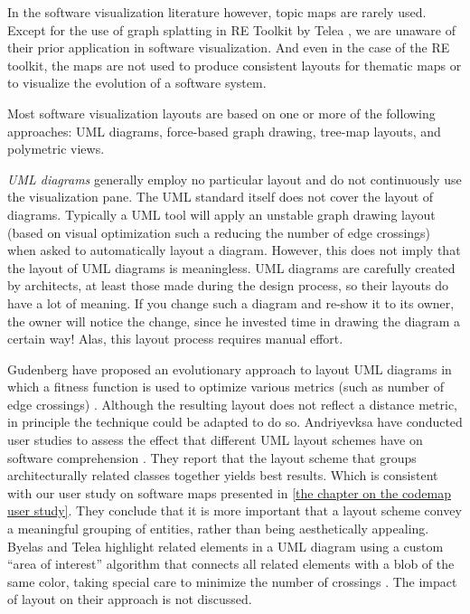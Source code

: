 In the software visualization literature however, topic maps are rarely used.
Except for the use of graph splatting in RE Toolkit by Telea \etal \cite{Tele03a}, we are unaware of their prior application in software visualization. And even in the case of the RE toolkit, the maps are not used to produce consistent layouts for thematic maps or to visualize the evolution of a software system. 

Most software visualization layouts are based on one or more of the following approaches: UML diagrams, force-based graph drawing, tree-map layouts, and polymetric views.

\emph{UML diagrams} generally employ no particular layout and do not continuously use the visualization pane. The UML standard itself does not cover the layout of diagrams. Typically a UML tool will apply an unstable graph drawing layout (\eg based on visual optimization such a reducing the number of edge crossings) when asked to automatically layout a diagram. However, this does not imply that the layout of UML diagrams is meaningless. UML diagrams are carefully created by architects, at least those made during the design process, so their layouts do have a lot of meaning. If you change such a diagram and re-show it to its owner, the owner will notice the change, since he invested time in drawing the diagram a certain way! Alas, this layout process requires manual effort.

Gudenberg \etal have proposed an evolutionary approach to layout UML diagrams in which a fitness function is used to optimize various metrics (such as number of edge crossings) \cite{Gude06a}. Although the resulting layout does not reflect a distance metric, in principle the technique could be adapted to do so. Andriyevksa \etal have conducted user studies to assess the effect that different UML layout schemes have on software comprehension \cite{Andr05a}.
They report that the layout scheme that groups architecturally related classes together yields best results. Which is consistent with our user study on software maps presented in \autoref{the chapter on the codemap user study}.
They conclude that it is more important that a layout scheme convey %
a meaningful grouping of entities, rather than being aesthetically appealing. Byelas and Telea highlight related elements in a UML
diagram using a custom ``area of interest'' algorithm that connects all related elements with a blob of the same color, taking special care to minimize the number of crossings \cite{Byel06a}.
The impact of layout on their approach is not discussed.

